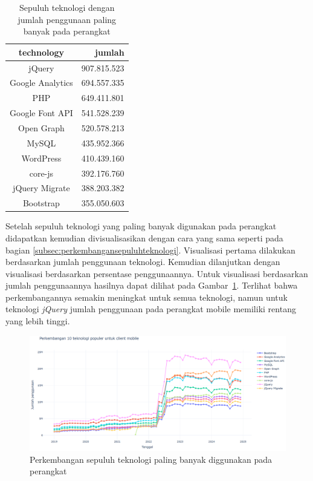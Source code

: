 \begin{table}[H]
\centering
\caption{Sepuluh teknologi dengan jumlah penggunaan paling banyak pada perangkat \mobile}
\label{tab:sepuluhteknologimobilereal}
\begin{tabular}{|c|r|}
\hline
technology & jumlah \\ \hline
jQuery & 907.815.523 \\ \hline
Google Analytics & 694.557.335 \\ \hline
PHP & 649.411.801 \\ \hline
Google Font API & 541.528.239 \\ \hline
Open Graph & 520.578.213 \\ \hline
MySQL & 435.952.366 \\ \hline
WordPress & 410.439.160 \\ \hline
core-js & 392.176.760 \\ \hline
jQuery Migrate & 388.203.382 \\ \hline
Bootstrap & 355.050.603 \\ \hline
\end{tabular}
\end{table}

Setelah sepuluh teknologi yang paling banyak digunakan pada perangkat \mobile didapatkan kemudian divisualisasikan dengan cara yang sama seperti pada bagian \ref{subsec:perkembangansepuluhteknologi}. Visualisasi pertama dilakukan berdasarkan jumlah penggunaan teknologi. Kemudian dilanjutkan dengan visualisasi berdasarkan persentase penggunaannya. Untuk visualisasi berdasarkan jumlah penggunaannya hasilnya dapat dilihat pada Gambar~\ref{fig:sepuluhmobilereal}. Terlihat bahwa perkembangannya semakin meningkat untuk semua teknologi, namun untuk teknologi \textit{jQuery} jumlah penggunaan pada perangkat mobile memiliki rentang yang lebih tinggi. 

\begin{figure}[H]
    \centering
    \includegraphics[width=0.7\linewidth]{Gambar/perkembanganmobilereal.png}
    \caption{Perkembangan sepuluh teknologi paling banyak diggunakan pada perangkat \mobile}
    \label{fig:sepuluhmobilereal}
\end{figure}

